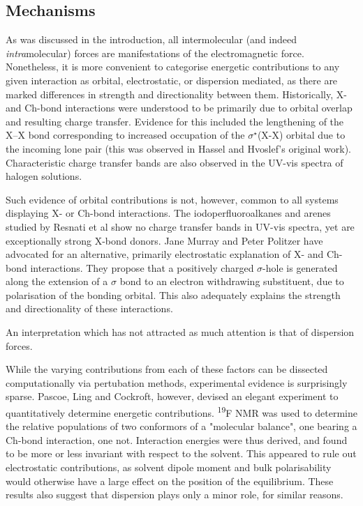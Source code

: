 \begin{refsection}
\subsection{Mechanisms}
As was discussed in the introduction, all intermolecular (and indeed \emph{intra}molecular) forces are manifestations of the electromagnetic force.
Nonetheless, it is more convenient to categorise energetic contributions to any given interaction as orbital, electrostatic, or dispersion mediated, as there are marked differences in strength and directionality between them.
Historically, X- and Ch-bond interactions were understood to be primarily due to orbital overlap and resulting charge transfer.
Evidence for this included the lengthening of the X--X bond corresponding to increased occupation of the $\sigma^{\star}$(X-X) orbital due to the incoming lone pair (this was observed in Hassel and Hvoslef's original work\autocite{Hassel1954}).
Characteristic charge transfer bands are also observed in the UV-vis spectra of halogen solutions.\autocite{Blackstock1987}

Such evidence of orbital contributions is not, however, common to all systems displaying X- or Ch-bond interactions.
The iodoperfluoroalkanes and arenes studied by Resnati et al show no charge transfer bands in UV-vis spectra, yet are exceptionally strong X-bond donors.\autocite{Yan2014}
Jane Murray and Peter Politzer have advocated for an alternative, primarily electrostatic explanation of X- and Ch-bond interactions.\autocite{Murray2008,Murray2009}
They propose that a positively charged $\sigma$-hole is generated along the extension of a $\sigma$ bond to an electron withdrawing substituent, due to polarisation of the bonding orbital.
This also adequately explains the strength and directionality of these interactions.

An interpretation which has not attracted as much attention is that of dispersion forces.

While the varying contributions from each of these factors can be dissected computationally via pertubation methods, experimental evidence is surprisingly sparse.
Pascoe, Ling and Cockroft, however, devised an elegant experiment to quantitatively determine energetic contributions.\autocite{Pascoe2017}
\textsuperscript{19}F NMR was used to determine the relative populations of two conformors of a "molecular balance", one bearing a Ch-bond interaction, one not.
Interaction energies were thus derived, and found to be more or less invariant with respect to the solvent.
This appeared to rule out electrostatic contributions, as solvent dipole moment and bulk polarisability would otherwise have a large effect on the position of the equilibrium.
These results also suggest that dispersion plays only a minor role, for similar reasons.


\end{refsection}
